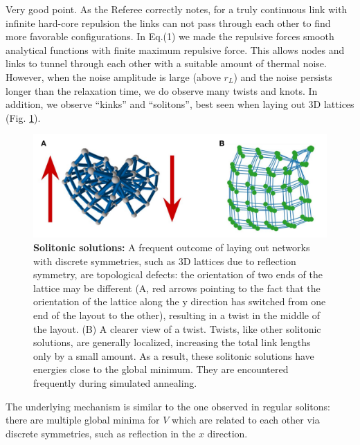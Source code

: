 \documentclass[11pt]{article}
\begin{document}
\begin{response}
Very good point. 
As the Referee correctly notes, for
a truly continuous link with infinite hard-core repulsion %
the links can not pass through each other to find more favorable configurations. 
In Eq.(1) we made the repulsive forces smooth analytical functions with finite maximum repulsive force. 
This allows nodes and links to tunnel through each other with a suitable amount of thermal noise.
However, when the noise amplitude is large (above $r_L$) and the 
noise persists longer than the relaxation time, we do observe many twists and knots. 
In addition, we observe ``kinks'' and ``solitons'', best seen when laying out 3D lattices (Fig. \ref{fig:twist}).
\begin{figure}[ht]
    \centering
    \includegraphics[width=.8\textwidth]{fig-09-19/3D-twist.pdf}
    \caption{{\bf Solitonic solutions:} A frequent outcome of laying out networks with discrete symmetries, such as 3D lattices due to reflection symmetry, are topological defects: the orientation of two ends of the lattice may be different (A, red arrows pointing to the fact that the orientation of the lattice along the y direction has switched from one end of the layout to the other), resulting in a twist in the middle of the layout. 
    (B) A clearer view of a twist. 
    Twists, like other solitonic solutions, are generally localized, increasing the total link lengths only by a small amount. 
    As a result, these solitonic solutions have energies close to the global minimum.
    They are encountered frequently during simulated annealing. 
    }
    \label{fig:twist}
\end{figure}
The underlying mechanism is similar to the one observed in regular solitons: there are multiple global minima for $V$ which are related to each other via discrete symmetries, such as reflection in the $x$ direction. 

\end{response}
\end{document}
